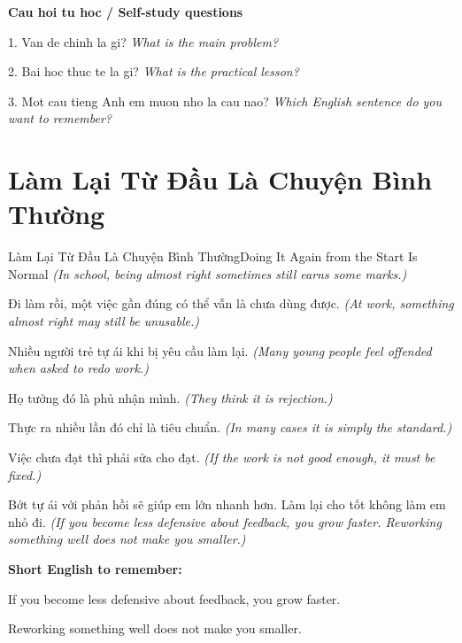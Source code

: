 \begin{tuhocnhanh}
\textbf{Cau hoi tu hoc / Self-study questions}

1. Van de chinh la gi? \textit{What is the main problem?}

2. Bai hoc thuc te la gi? \textit{What is the practical lesson?}

3. Mot cau tieng Anh em muon nho la cau nao? \textit{Which English sentence do you want to remember?}
\end{tuhocnhanh}
\ngancach

\section{Làm Lại Từ Đầu Là Chuyện Bình Thường}
\begin{truyen}{Làm Lại Từ Đầu Là Chuyện Bình Thường}{Doing It Again from the Start Is Normal}
\textit{(In school, being almost right sometimes still earns some marks.)}

Đi làm rồi, một việc gần đúng có thể vẫn là chưa dùng được.
\textit{(At work, something almost right may still be unusable.)}

Nhiều người trẻ tự ái khi bị yêu cầu làm lại.
\textit{(Many young people feel offended when asked to redo work.)}

Họ tưởng đó là phủ nhận mình.
\textit{(They think it is rejection.)}

Thực ra nhiều lần đó chỉ là tiêu chuẩn.
\textit{(In many cases it is simply the standard.)}

Việc chưa đạt thì phải sửa cho đạt.
\textit{(If the work is not good enough, it must be fixed.)}

\end{truyen}

\begin{baihoc}
Bớt tự ái với phản hồi sẽ giúp em lớn nhanh hơn. Làm lại cho tốt không làm em nhỏ đi.
\textit{(If you become less defensive about feedback, you grow faster. Reworking something well does not make you smaller.)}
\end{baihoc}

\begin{ghinhoanh}
\textbf{Short English to remember:}

If you become less defensive about feedback, you grow faster.

Reworking something well does not make you smaller.

\end{ghinhoanh}

